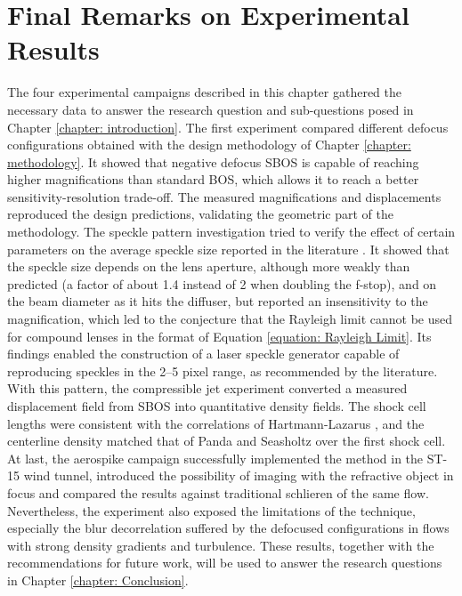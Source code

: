 \section{Final Remarks on Experimental Results}
\label{section: Final Remarks Results}
The four experimental campaigns described in this chapter gathered the necessary data to answer the research question and sub-questions posed in Chapter \ref{chapter: introduction}. The first experiment compared different defocus configurations obtained with the design methodology of Chapter \ref{chapter: methodology}. It showed that negative defocus SBOS is capable of reaching higher magnifications than standard BOS, which allows it to reach a better sensitivity-resolution trade-off. The measured magnifications and displacements reproduced the design predictions, validating the geometric part of the methodology. The speckle pattern investigation tried to verify the effect of certain parameters on the average speckle size reported in the literature \cite{Barker&Fourney, NikitaFominBook, Meier&Roesgen2013}. It showed that the speckle size depends on the lens aperture, although more weakly than predicted (a factor of about 1.4 instead of 2 when doubling the f-stop), and on the beam diameter as it hits the diffuser, but reported an insensitivity to the magnification, which led to the conjecture that the Rayleigh limit cannot be used for compound lenses in the format of Equation \ref{equation: Rayleigh Limit}. Its findings enabled the construction of a laser speckle generator capable of reproducing speckles in the 2--5 pixel range, as recommended by the literature. With this pattern, the compressible jet experiment converted a measured displacement field from SBOS into quantitative density fields. The shock cell lengths were consistent with the correlations of Hartmann-Lazarus \cite{Hartmann1941}, and the centerline density matched that of Panda and Seasholtz \cite{Panda1999} over the first shock cell. At last, the aerospike campaign successfully implemented the method in the ST-15 wind tunnel, introduced the possibility of imaging with the refractive object in focus and compared the results against traditional schlieren of the same flow. Nevertheless, the experiment also exposed the limitations of the technique, especially the blur decorrelation suffered by the defocused configurations in flows with strong density gradients and turbulence. These results, together with the recommendations for future work, will be used to answer the research questions in Chapter \ref{chapter: Conclusion}.